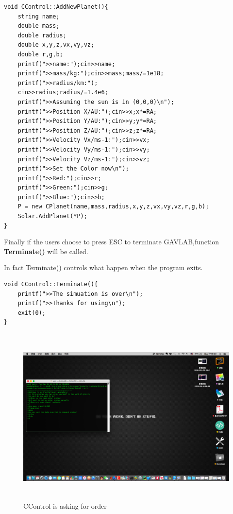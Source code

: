\documentclass[12pt]{article}
\begin{document}
\begin{lstlisting}[caption=AddNewPlanet()]
void CControl::AddNewPlanet(){
    string name;
    double mass;
    double radius;
    double x,y,z,vx,vy,vz;
    double r,g,b;
    printf(">>name:");cin>>name;
    printf(">>mass/kg:");cin>>mass;mass/=1e18;
    printf(">>radius/km:");
    cin>>radius;radius/=1.4e6;
    printf(">>Assuming the sun is in (0,0,0)\n");
    printf(">>Position X/AU:");cin>>x;x*=RA;
    printf(">>Position Y/AU:");cin>>y;y*=RA;
    printf(">>Position Z/AU:");cin>>z;z*=RA;
    printf(">>Velocity Vx/ms-1:");cin>>vx;
    printf(">>Velocity Vy/ms-1:");cin>>vy;
    printf(">>Velocity Vz/ms-1:");cin>>vz;
    printf(">>Set the Color now\n");
    printf(">>Red:");cin>>r;
    printf(">>Green:");cin>>g;
    printf(">>Blue:");cin>>b;
    P = new CPlanet(name,mass,radius,x,y,z,vx,vy,vz,r,g,b);
    Solar.AddPlanet(*P);
}
\end{lstlisting}
\clearpage

Finally if the users choose to press ESC to terminate GAVLAB,function
\textbf{Terminate()} will be called.

In fact Terminate() controls what happen when the program exits.\\
\begin{lstlisting}[caption=Terminate()]
void CControl::Terminate(){
    printf(">>The simuation is over\n");
    printf(">>Thanks for using\n");
    exit(0);
}
\end{lstlisting}

\begin{figure}[H]
\centering
\includegraphics[width=14.4cm,height=9cm]{control.png}
\caption{CControl is asking for order}
\end{figure}
\clearpage
\end{document}
